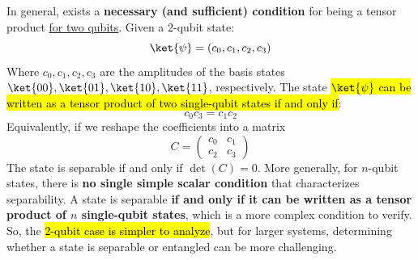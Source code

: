 \highspace
In general, exists a \textbf{necessary (and sufficient) condition} for being a tensor product \underline{for two qubits}. Given a 2-qubit state:
\begin{equation*}
    \ket{\psi} = \left(c_{0}, c_{1}, c_{2}, c_{3}\right)
\end{equation*}
Where $c_{0}, c_{1}, c_{2}, c_{3}$ are the amplitudes of the basis states $\ket{00}, \ket{01}, \ket{10}, \ket{11}$, respectively. The state \hl{$\ket{\psi}$ can be written as a tensor product of two single-qubit states if and only if}:
\begin{equation}\label{eq:separability-condition}
    c_{0}c_{3} = c_{1}c_{2}
\end{equation}
Equivalently, if we reshape the coefficients into a matrix
\begin{equation*}
    C =
    \begin{pmatrix}
        c_0 & c_1 \\
        c_2 & c_3
    \end{pmatrix}
\end{equation*}
The state is separable if and only if $\det(C) = 0$. More generally, for $n$-qubit states, there is \textbf{no single simple scalar condition} that characterizes separability. A state is separable \textbf{if and only if it can be written as a tensor product of $n$ single-qubit states}, which is a more complex condition to verify. So, the \hl{2-qubit case is simpler to analyze}, but for larger systems, determining whether a state is separable or entangled can be more challenging.


